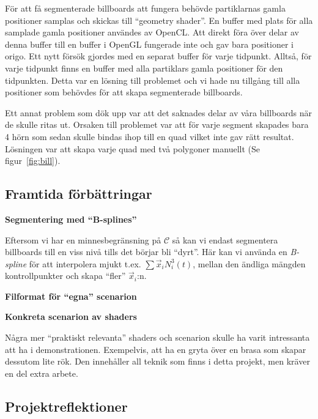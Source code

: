 \documentclass[a4paper]{article}
\begin{document}
\begin{multicols}{2}
            För att få segmenterade billboards att fungera behövde partiklarnas gamla positioner samplas och skickas till ``geometry shader''. En buffer med plats för alla samplade gamla positioner användes av OpenCL. Att direkt föra över delar av denna buffer till en buffer i OpenGL fungerade inte och gav bara positioner i origo. Ett nytt försök gjordes med en separat buffer för varje tidpunkt. Alltså, för varje tidpunkt finns en buffer med alla partiklars gamla positioner för den tidpunkten. Detta var en lösning till problemet och vi hade nu tillgång till alla positioner som behövdes för att skapa segmenterade billboards.
            
            Ett annat problem som dök upp var att det saknades delar av våra billboards när de skulle ritas ut. Orsaken till problemet var att för varje segment skapades bara 4 hörn som sedan skulle bindas ihop till en quad vilket inte gav rätt resultat. Lösningen var att skapa varje quad med två polygoner manuellt (Se figur~\ref{fig:bill}). 

        \subsection{Framtida förbättringar}

            \textbf{Segmentering med ``B-splines''}

            Eftersom vi har en minnesbegränsning på \(\mathcal{C}\) så kan vi endast segmentera billboards till en viss nivå tills det börjar bli ``dyrt''. Här kan vi använda en \emph{B-spline} för att interpolera mjukt t.ex. \(\sum \vec{x}_i N^3_i(t)\), mellan den ändliga mängden kontrollpunkter och skapa ``fler'' \(\vec{x}_i\):n.

            \textbf{Filformat för ``egna'' scenarion}


            \textbf{Konkreta scenarion av shaders}

            Några mer ``praktiskt relevanta'' shaders och scenarion skulle ha varit intressanta att ha i demonstrationen. Exempelvis, att ha en gryta över en brasa som skapar dessutom lite rök. Den innehåller all teknik som finns i detta projekt, men kräver en del extra arbete.

        \subsection{Projektreflektioner}

    \nocite{*} %
    
    
\end{multicols}
\end{document}
